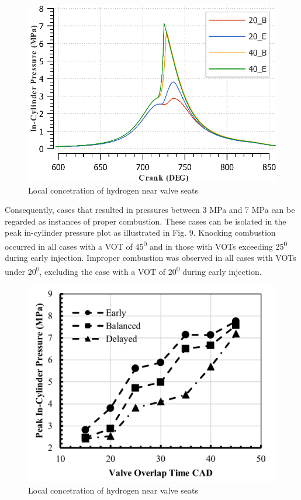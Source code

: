 \documentclass[conference]{IEEEtran}
\begin{document}
\begin{figure}[htbp]
    \centerline{\includegraphics{plots and graphs/7.png}}
    \caption{Local concetration of hydrogen near valve seats}
    \label{plt_7}
    \end{figure}

Consequently, cases that resulted in pressures between 3 MPa and 7 MPa can be regarded as instances of proper combustion. 
These cases can be isolated in the peak in-cylinder pressure plot as illustrated in Fig. 9. 
Knocking combustion occurred in all cases with a VOT of 45\textsuperscript{0} and in those with VOTs exceeding 25\textsuperscript{0} during early injection. 
Improper combustion was observed in all cases with VOTs under 20\textsuperscript{0}, excluding the case with a VOT of 20\textsuperscript{0} during early injection.

\begin{figure}[htbp]
    \centerline{\includegraphics{plots and graphs/9.png}}
    \caption{Local concetration of hydrogen near valve seats}
    \label{plt_9}
    \end{figure}
\end{document}
